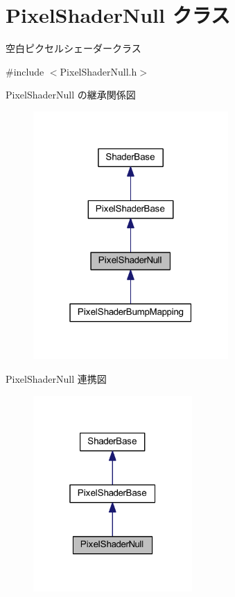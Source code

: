 \hypertarget{class_pixel_shader_null}{}\section{Pixel\+Shader\+Null クラス}
\label{class_pixel_shader_null}


空白ピクセルシェーダークラス  




{\ttfamily \#include $<$Pixel\+Shader\+Null.\+h$>$}



Pixel\+Shader\+Null の継承関係図\nopagebreak
\begin{figure}[H]
\begin{center}
\leavevmode
\includegraphics[width=211pt]{class_pixel_shader_null__inherit__graph}
\end{center}
\end{figure}


Pixel\+Shader\+Null 連携図\nopagebreak
\begin{figure}[H]
\begin{center}
\leavevmode
\includegraphics[width=172pt]{class_pixel_shader_null__coll__graph}
\end{center}
\end{figure}
